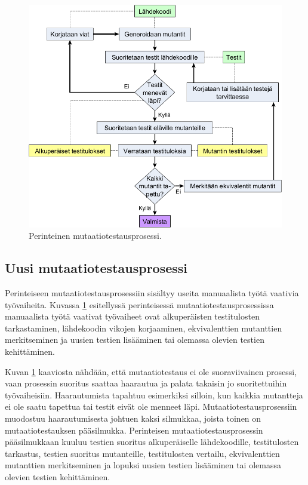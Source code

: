 \documentclass[finnish, grading]{tktltiki2}
\theoremstyle{definition}
\theoremstyle{remark}
\begin{document}
\begin{figure}[H]
	\centering
		\includegraphics[width=\textwidth]{mutaatiotestausprosessi3}
	\caption{Perinteinen mutaatiotestausprosessi.}
	\label{figure:Mutaatiotestausprosessi}
\end{figure}

\subsection{Uusi mutaatiotestausprosessi}

Perinteiseen mutaatiotestausprosessiin sisältyy useita manuaalista työtä vaativia työvaiheita. Kuvassa \ref{figure:Mutaatiotestausprosessi} esitellyssä perinteisessä mutaatiotestausprosessissa manuaalista työtä vaativat työvaiheet ovat alkuperäisten testitulosten tarkastaminen, lähdekoodin vikojen korjaaminen, ekvivalenttien mutanttien merkitseminen ja uusien testien lisääminen tai olemassa olevien testien kehittäminen. 

Kuvan \ref{figure:Mutaatiotestausprosessi} kaaviosta nähdään, että mutaatiotestaus ei ole suoraviivainen prosessi, vaan prosessin suoritus saattaa haarautua ja palata takaisin jo suoritettuihin työvaiheisiin. Haarautumista tapahtuu esimerkiksi silloin, kun kaikkia mutantteja ei ole saatu tapettua tai testit eivät ole menneet läpi. Mutaatiotestausprosessiin muodostuu haarautumisesta johtuen kaksi silmukkaa, joista toinen on mutaatiotestauksen pääsilmukka. Perinteisen mutaatiotestausprosessin pääsilmukkaan kuuluu testien suoritus alkuperäiselle lähdekoodille, testitulosten tarkastus, testien suoritus mutanteille, testitulosten vertailu, ekvivalenttien mutanttien merkitseminen ja lopuksi uusien testien lisääminen tai olemassa olevien testien kehittäminen.
\end{document}
